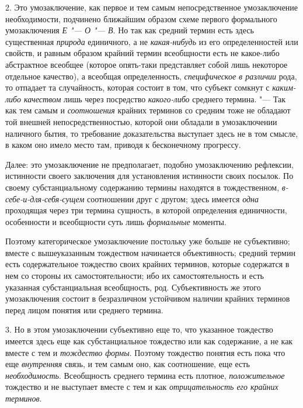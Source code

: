 2. Это умозаключение, как первое и тем самым непосредственное
умозаключение необходимости, подчинено ближайшим образом схеме первого
формального умозаключения {\em Е "--- О "--- В}. Но так как средний
термин есть здесь существенная
{\em природа} единичного,
а не {\em какая-нибудь}
из его определенностей или свойств, и равным образом крайний
термин всеобщности есть не какое-либо абстрактное всеобщее (которое
опять-таки представляет собой лишь некоторое отдельное качество), а
всеобщая определенность,
{\em специфическое в различии}
рода, то отпадает та случайность, которая состоит в том, что
субъект сомкнут с {\em каким-либо
качеством} лишь через посредство
{\em какого-либо}
среднего термина. "--- Так как тем самым и
{\em соотношения} крайних
терминов со средним тоже не обладают той внешней непосредственностью,
которой они обладали в умозаключении наличного бытия, то требование
доказательства выступает здесь не в том смысле, в каком оно
имело место там, приводя к бесконечному прогрессу.

Далее: это умозаключение не предполагает, подобно
умозаключению рефлексии, истинности своего заключения для установления
истинности своих посылок. По своему субстанциальному содержанию термины
находятся в тождественном,
{\em в-себе-и-для-себя-сущем}
соотношении друг с другом; здесь имеется
{\em одна} проходящая
через три термина сущность, в которой определения единичности, особенности
и всеобщности суть лишь
{\em формальные}
моменты.

Поэтому категорическое умозаключение постольку уже больше не
субъективно; вместе с вышеуказанным тождеством начинается объективность;
средний термин есть содержательное тождество своих крайних терминов,
которые содержатся в нем со стороны их самостоятельности; ибо их
самостоятельность и есть указанная субстанциальная всеобщность, род.
Субъективность же этого умозаключения состоит в безразличном устойчивом
наличии крайних терминов перед лицом понятия или среднего термина.

3. Но в этом умозаключении субъективно еще то, что указанное
тождество имеется здесь еще как субстанциальное тождество или как
содержание, а не как вместе с тем и
{\em тождество формы}.
Поэтому тождество понятия есть пока что еще
{\em внутренняя} связь, и
тем самым оно, как соотношение, еще есть
{\em необходимость}.
Всеобщность среднего термина есть плотное,
{\em положительное}
тождество и не выступает вместе с тем и как
{\em отрицательность его крайних
терминов}.

